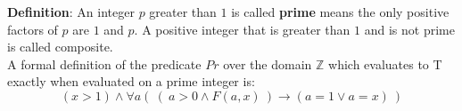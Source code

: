 
{\bf Definition}:  An integer $p$ greater than $1$ is called {\bf prime} means 
the only positive factors of 
$p$ are $1$ and $p$. A positive integer that is greater than $1$ and is not prime 
is called composite. \\

A formal definition of the predicate $Pr$ over the domain $\mathbb{Z}$ 
which evaluates to T exactly when evaluated on a prime integer is:
\[
    (x > 1) \land \forall a( ~ (~ a > 0 \land F(a,x) ~) \to (a = 1 \lor a = x) ~)
\]
